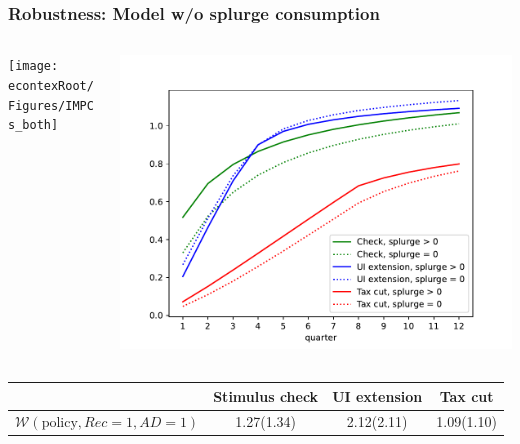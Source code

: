 \documentclass[pdflatex,aspectratio=169, handout]{beamer}
\begin{document}
\begin{frame}
\frametitle{Robustness: Model w/o splurge consumption}
\begin{columns}
\begin{column}{0.5\textwidth}
	\texttt{[image: \\econtexRoot/Figures/IMPCs\_both]}
\end{column}
\begin{column}{0.5\textwidth}
	\includegraphics[width=\linewidth]{Code/HA-Models/FromPandemicCode/Figures/Splurge0/Cummulative_multipliers_SplurgeComp}
\end{column}
\end{columns}
\begin{center}
\begin{tabular}{@{}lccc@{}} 
	\toprule 
	& Stimulus check      & UI extension    & Tax cut    \\  \midrule 
	$\mathcal{W}(\text{policy}, Rec=1, AD=1)$ & 1.27(1.34)  & 2.12(2.11)  & 1.09(1.10)     \\ \bottomrule
\end{tabular} 
\end{center}
\end{frame}
\end{document}
